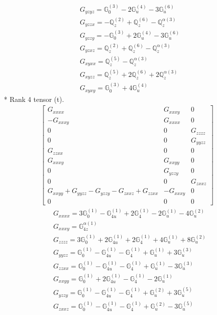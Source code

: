 \documentclass[fleqn,8pt,landscape]{jsarticle}
\begin{document}
\begin{align*}
& G_{yzyz} = \mathbb{G}_{0}^{(3)} - 2 \mathbb{G}_{u}^{(4)} - 3 \mathbb{G}_{u}^{(6)} \\
& G_{yzzx} = - \mathbb{Q}_{z}^{(2)} + \mathbb{Q}_{z}^{(6)} - \mathbb{Q}_{z}^{\alpha(3)} \\
& G_{yzzy} = - \mathbb{G}_{0}^{(3)} + 2 \mathbb{G}_{u}^{(4)} - 3 \mathbb{G}_{u}^{(6)} \\
& G_{yzxz} = \mathbb{Q}_{z}^{(2)} + \mathbb{Q}_{z}^{(6)} - \mathbb{Q}_{z}^{\alpha(3)} \\
& G_{xyxx} = \mathbb{Q}_{z}^{(5)} - \mathbb{Q}_{z}^{\alpha(3)} \\
& G_{xyzz} = \mathbb{Q}_{z}^{(5)} + 2 \mathbb{Q}_{z}^{(6)} + 2 \mathbb{Q}_{z}^{\alpha(3)} \\
& G_{xyxy} = \mathbb{G}_{0}^{(3)} + 4 \mathbb{G}_{u}^{(4)}
\end{align*}
* Rank 4 tensor (t).
\begin{align*}
\begin{bmatrix} G_{xxxx} & G_{xxxy} & 0 \\ - G_{xxxy} & G_{xxxx} & 0 \\ 0 & 0 & G_{zzzz} \\ 0 & 0 & G_{yyzz} \\ G_{zzxx} & 0 & 0 \\ G_{xxxy} & G_{xxyy} & 0 \\ 0 & G_{yzzy} & 0 \\ 0 & 0 & G_{zxxz} \\ G_{xxyy} + G_{yyzz} - G_{yzzy} - G_{zxxz} + G_{zzxx} & - G_{xxxy} & 0 \\ 0 & 0 & 0 \end{bmatrix}
\end{align*}
\begin{align*}
& G_{xxxx} = 3 \mathbb{G}_{0}^{(1)} - \mathbb{G}_{4u}^{(1)} + 2 \mathbb{G}_{4}^{(1)} - 2 \mathbb{G}_{u}^{(1)} - 4 \mathbb{G}_{u}^{(2)} \\
& G_{xxxy} = \mathbb{G}_{4z}^{\alpha(1)} \\
& G_{zzzz} = 3 \mathbb{G}_{0}^{(1)} + 2 \mathbb{G}_{4u}^{(1)} + 2 \mathbb{G}_{4}^{(1)} + 4 \mathbb{G}_{u}^{(1)} + 8 \mathbb{G}_{u}^{(2)} \\
& G_{yyzz} = \mathbb{G}_{0}^{(1)} - \mathbb{G}_{4u}^{(1)} - \mathbb{G}_{4}^{(1)} + \mathbb{G}_{u}^{(1)} + 3 \mathbb{G}_{u}^{(3)} \\
& G_{zzxx} = \mathbb{G}_{0}^{(1)} - \mathbb{G}_{4u}^{(1)} - \mathbb{G}_{4}^{(1)} + \mathbb{G}_{u}^{(1)} - 3 \mathbb{G}_{u}^{(3)} \\
& G_{xxyy} = \mathbb{G}_{0}^{(1)} + 2 \mathbb{G}_{4u}^{(1)} - \mathbb{G}_{4}^{(1)} - 2 \mathbb{G}_{u}^{(1)} \\
& G_{yzzy} = \mathbb{G}_{0}^{(1)} - \mathbb{G}_{4u}^{(1)} - \mathbb{G}_{4}^{(1)} + \mathbb{G}_{u}^{(2)} + 3 \mathbb{G}_{u}^{(5)} \\
& G_{zxxz} = \mathbb{G}_{0}^{(1)} - \mathbb{G}_{4u}^{(1)} - \mathbb{G}_{4}^{(1)} + \mathbb{G}_{u}^{(2)} - 3 \mathbb{G}_{u}^{(5)}
\end{align*}
\end{document}
